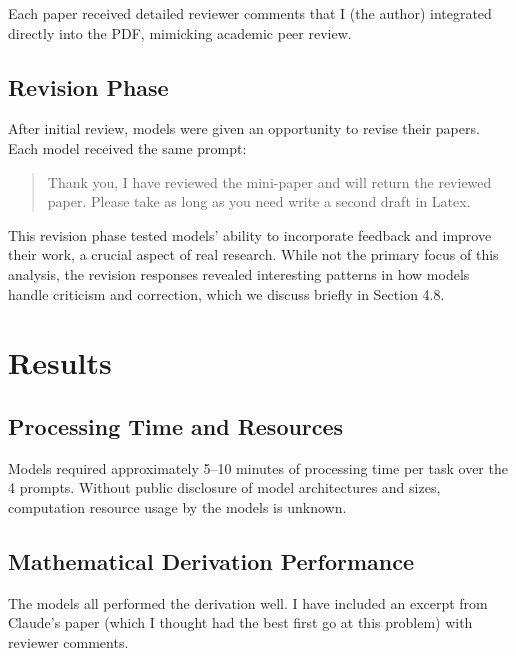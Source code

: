 \documentclass[11pt]{article}
\begin{document}
Each paper received detailed reviewer comments that I (the author) integrated directly into the PDF, mimicking academic peer review.

\subsection{Revision Phase}

After initial review, models were given an opportunity to revise their papers. Each model received the same prompt:

\begin{quote}
Thank you, I have reviewed the mini-paper and will return the reviewed paper. Please take as long as you need write a second draft in Latex.
\end{quote}

This revision phase tested models' ability to incorporate feedback and improve their work, a crucial aspect of real research. While not the primary focus of this analysis, the revision responses revealed interesting patterns in how models handle criticism and correction, which we discuss briefly in Section 4.8.

\section{Results}

\subsection{Processing Time and Resources}

Models required approximately 5--10 minutes of processing time per task over the 4 prompts. Without public disclosure of model architectures and sizes, computation resource usage by the models is unknown.

\subsection{Mathematical Derivation Performance}

The models all performed the derivation well. I have included an excerpt from Claude's paper (which I thought had the best first go at this problem) with reviewer comments.
\end{document}
